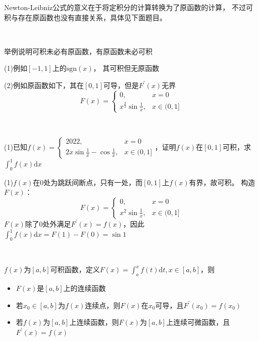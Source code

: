 \begin{note}
  Newton-Leibniz公式的意义在于将定积分的计算转换为了原函数的计算，
  不过可积与存在原函数也没有直接关系，具体见下面题目。
\end{note}

~

\begin{exercise}[可积与原函数]
  举例说明可积未必有原函数，有原函数未必可积
\end{exercise}

\begin{solution}
  (1)例如$[-1,1]$上的$\text{sgn}(x)$，
  其可积但无原函数

  (2)例如原函数如下，其在$[0,1]$可导，但是$F^{\prime}(x)$无界
  \begin{equation*}
    F(x) = 
    \begin{cases}
      0, & x = 0\\
      x^{\frac{3}{2}} \sin \frac{1}{x}, & x \in (0,1]
    \end{cases}
  \end{equation*}
\end{solution}

~

\begin{exercise}
  (1)已知$f(x) =
  \begin{cases}
    2022, &  x = 0\\
    2x \sin \frac{1}{x} - \cos \frac{1}{x}, & x \in (0,1]
  \end{cases}
  $，证明$f(x)$在$[0,1]$可积，求$\int_0^1 f(x)\mathrm{d} x$
\end{exercise}

\begin{solution}
  (1)$f(x)$在$0$处为跳跃间断点，只有一处，而$[0,1]$上$f(x)$有界，故可积。
  构造$F(x)$：
  \begin{equation*}
    F(x) =
    \begin{cases}
      0, & x = 0\\
      x^2 \sin \frac{1}{x}, & x \in (0,1]
    \end{cases}
  \end{equation*}
  $F(x)$除了$0$处外满足$F^{\prime}(x) = f(x)$，因此$\int_0^1 f(x)\mathrm{d} x = F(1) - F(0) = \sin 1$
\end{solution}

~

\begin{theorem}[微积分基本定理]
  $f(x)$为$[a,b]$可积函数，定义$F(x) = \int_a^x f(t)\mathrm{d} t, x \in [a,b]$，则
  \begin{itemize}
  \item $F(x)$是$[a,b]$上的连续函数
  \item 若$x_0 \in [a,b]$为$f(x)$连续点，则$F(x)$在$x_0$可导，且$F^{\prime}(x_0) = f(x_0)$
  \item 若$f(x)$为$[a,b]$上连续函数，则$F(x)$为$[a,b]$上连续可微函数，且$F^{\prime}(x) = f(x)$
  \end{itemize}
\end{theorem}

